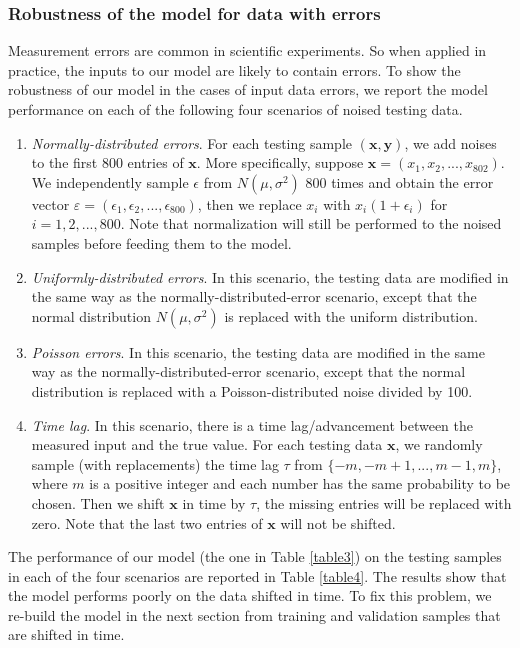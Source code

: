 \documentclass[thmsa,onecolumn,12pt]{article}%
\begin{document}
\subsubsection{Robustness of the model for data with errors}
\label{noise-method}

Measurement errors are common in scientific experiments. So when applied in practice, the inputs to our model are likely to contain errors. To show the robustness of our model in the cases of input data errors, we report the model performance on each of the following four scenarios of noised testing data.
\begin{enumerate}
\item \emph{Normally-distributed errors}. For each testing sample $(\mathbf{x},\mathbf{y})$, we add noises to the first 800 entries of $\mathbf{x}$. More specifically, suppose $\mathbf{x}=(x_1, x_2, ..., x_{802})$. We independently sample $\epsilon$ from $N(\mu,\sigma^2)$ 800 times and obtain the error vector $\varepsilon=(\epsilon_1, \epsilon_2,...,\epsilon_{800})$, then we replace $x_i$ with $x_{i}(1+\epsilon_i)$ for $i=1,2,...,800$. Note that normalization will still be performed to the noised samples before feeding them to the model.

\item \emph{Uniformly-distributed errors}. In this scenario, the testing data are modified in the same way as the normally-distributed-error scenario, except that the normal distribution $N(\mu,\sigma^2)$ is replaced with the uniform distribution.

\item \emph{Poisson errors}. In this scenario, the testing data are modified in the same way as the normally-distributed-error scenario, except that the normal distribution is replaced with a Poisson-distributed noise divided by 100.

\item \emph{Time lag}. In this scenario, there is a time lag/advancement between the measured input and the true value. For each testing data $\mathbf{x}$, we randomly sample (with replacements) the time lag $\tau$ from $\{-m,-m+1,...,m-1,m\}$, where $m$ is a positive integer and each number has the same probability to be chosen. Then we shift $\mathbf{x}$ in time by $\tau$, the missing entries will be replaced with zero. Note that the last two entries of $\mathbf{x}$ will not be shifted.
\end{enumerate}

The performance of our model (the one in Table \ref{table3}) on the testing samples in each of the four scenarios are reported in Table \ref{table4}. The results show that the model performs poorly on the data shifted in time. To fix this problem, we re-build the model in the next section from training and validation samples that are shifted in time.
\end{document}
